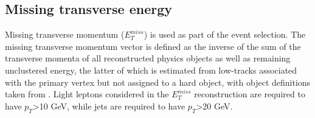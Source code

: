 \subsection{Missing transverse energy}
\label{subsec:met}

Missing transverse momentum ($E_T^{miss}$) is used as part of the event selection. The missing transverse momentum vector is defined as the inverse of the sum of the transverse momenta of all reconstructed physics objects as well as remaining unclustered energy, the latter of which is estimated from low-\pt tracks associated with the primary vertex but not assigned to a hard object, with object definitions taken from \cite{ATL-PHYS-PUB-2015-027}. Light leptons considered in the $E_T^{miss}$ reconstruction are required to have $p_T$>10 GeV, while jets are required to have $p_T$>20 GeV.

